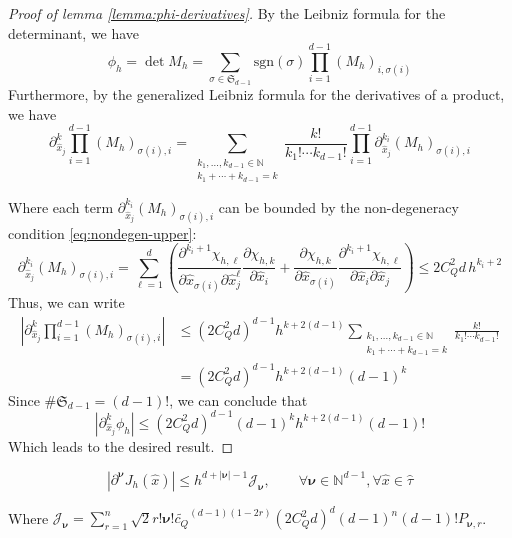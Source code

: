 ﻿\documentclass{article}
\begin{document}
\begin{proof}[Proof of lemma \ref{lemma:phi-derivatives}]
  By the Leibniz formula for the determinant, we have
  \begin{equation}
    \phi_h = \det M_h = \sum_{\sigma\in\mathfrak S_{d-1}}\text{sgn}(\sigma)\prod_{i=1}^{d-1}(M_h)_{i, \sigma(i)}
  \end{equation}
  Furthermore, by the generalized Leibniz formula for the derivatives of a product, we have
  \begin{equation}
    \partial_{\hat x_j}^k\prod_{i=1}^{d-1}(M_h)_{\sigma(i),i} = \sum_{\substack{k_1, \dots, k_{d-1}\in\mathbb N \\ k_1 + \cdots + k_{d-1} = k}}\frac{k!}{k_1!\cdots k_{d-1}!}\prod_{i=1}^{d-1}\partial_{\hat x_j}^{k_i}(M_h)_{\sigma(i),i}
  \end{equation}

  Where each term $\partial_{\hat x_j}^{k_i}(M_h)_{\sigma(i),i}$ can be bounded by the non-degeneracy condition \ref{eq:nondegen-upper}:
  \begin{equation}
    \partial_{\hat x_j}^{k_i}(M_h)_{\sigma(i),i} = \sum_{\ell=1}^{d}\left(\frac{\partial^{k_i+1}\chi_{h,\ell}}{\partial \hat x_{\sigma(i)}\partial\hat x_{j}^{\ell}}\frac{\partial\chi_{h,k}}{\partial \hat x_i} + \frac{\partial\chi_{h,k}}{\partial \hat x_{\sigma(i)}}\frac{\partial^{k_i+1}\chi_{h,\ell}}{\partial \hat x_i\partial\hat x_j}\right) \leq 2C_Q^2d\, h^{k_i+2}
  \end{equation}
  Thus, we can write
  \begin{align}
    |\partial_{\hat x_j}^k\prod_{i=1}^{d-1}(M_h)_{\sigma(i),i}| & \leq (2C_Q^2d)^{d-1}h^{k+2(d-1)}\sum_{\substack{k_1, \dots, k_{d-1}\in\mathbb N \\ k_1 + \cdots + k_{d-1} = k}}\frac{k!}{k_1!\cdots k_{d-1}!} \\
    & = (2C_Q^2d)^{d-1}h^{k+2(d-1)}(d-1)^k
  \end{align}
  Since $\#\mathfrak S_{d-1} = (d-1)!$, we can conclude that
  \begin{equation}
    |\partial_{\hat x_j}^k\phi_h| \leq (2C_Q^2d)^{d-1}(d-1)^kh^{k+2(d-1)}(d-1)!
  \end{equation}
  Which leads to the desired result.
\end{proof}

\begin{lemma}\label{lemma:J-derivatives}
  \begin{equation}
    |\partial^{\bm\nu}J_h(\hat x)| \leq h^{d+|\bm\nu| - 1}\mathcal J_{\bm\nu}
, \qquad \forall \bm\nu\in\mathbb N^{d-1}, \forall \hat x\in\hat\tau
  \end{equation}

  Where $\displaystyle{\mathcal J_{\bm\nu} = \sum_{r=1}^{n}\sqrt 2r!\bm\nu!\widetilde{c_Q}^{(d-1)(1-2r)}(2C_Q^2d)^d(d-1)^n(d-1)!P_{\bm\nu, r}}$.
\end{lemma}
\end{document}
